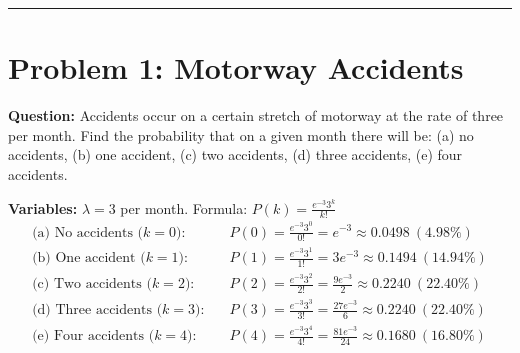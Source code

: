 \documentclass[11pt,a4paper]{article}
\begin{document}
\hrule
\vspace{0.5cm}

\section*{Problem 1: Motorway Accidents}
\textbf{Question:} Accidents occur on a certain stretch of motorway at the rate of three per month. Find the probability that on a given month there will be: (a) no accidents, (b) one accident, (c) two accidents, (d) three accidents, (e) four accidents.

\noindent\textbf{Variables:} $\lambda = 3$ per month. Formula: $P(k) = \frac{e^{-3} 3^k}{k!}$
\begin{align*}
    \text{(a) No accidents ($k=0$):} &\quad P(0) = \frac{e^{-3} 3^0}{0!} = e^{-3} \approx \mathbf{0.0498} \ (4.98\%) \\
    \text{(b) One accident ($k=1$):} &\quad P(1) = \frac{e^{-3} 3^1}{1!} = 3e^{-3} \approx \mathbf{0.1494} \ (14.94\%) \\
    \text{(c) Two accidents ($k=2$):} &\quad P(2) = \frac{e^{-3} 3^2}{2!} = \frac{9e^{-3}}{2} \approx \mathbf{0.2240} \ (22.40\%) \\
    \text{(d) Three accidents ($k=3$):} &\quad P(3) = \frac{e^{-3} 3^3}{3!} = \frac{27e^{-3}}{6} \approx \mathbf{0.2240} \ (22.40\%) \\
    \text{(e) Four accidents ($k=4$):} &\quad P(4) = \frac{e^{-3} 3^4}{4!} = \frac{81e^{-3}}{24} \approx \mathbf{0.1680} \ (16.80\%)
\end{align*}
\end{document}
